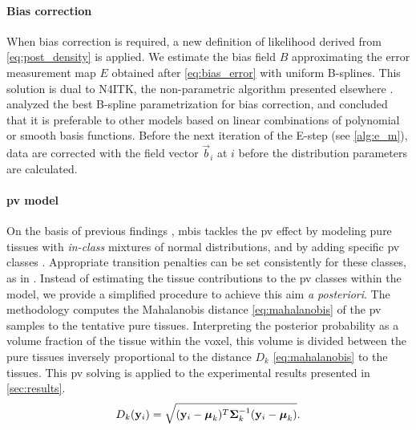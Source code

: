 \paragraph{Bias correction}\label{par:bias_correction} %
When bias correction is required, a new definition of likelihood
  derived from \eqref{eq:post_density} is applied.
We estimate the bias field $B$ approximating the error measurement map
  $E$ obtained after \eqref{eq:bias_error} with uniform B-splines.
This solution is dual to N4ITK, the non-parametric algorithm presented
  elsewhere \cite{tustison_n4itk:_2010}.
\citeauthor{tustison_n4itk:_2010} analyzed the best B-spline parametrization
  for bias correction, and concluded that it is preferable to other models
  based on linear combinations of polynomial or smooth basis functions.
Before the next iteration of the E-step (see \autoref{alg:e_m}), data are
  corrected with the field vector $\vec{b}_{i}$ at $i$ before the distribution 
  parameters are calculated.

\paragraph{\Acrlong*{pv} model}\label{par:model} %
On the basis of previous findings \citep{cuadra_comparison_2005}, \gls*{mbis}
  tackles the \gls*{pv} effect by modeling pure tissues with \emph{in-class}
  mixtures of normal distributions, and by adding specific \gls*{pv} classes
  \citep{noe_partial_2001}.
Appropriate transition penalties can be set consistently for these classes, as
  in \citep{cuadra_comparison_2005}.
Instead of estimating the tissue contributions to the \gls*{pv} classes
  within the model, we provide a simplified procedure to achieve this aim
  \emph{a posteriori}.
The methodology computes the Mahalanobis distance \eqref{eq:mahalanobis}
  of the \gls*{pv} samples to the tentative pure tissues.
Interpreting the posterior probability as a volume fraction of the tissue
  within the voxel, this volume is divided between the pure tissues inversely
  proportional to the distance $D_k$ \eqref{eq:mahalanobis} to the tissues.
This \gls*{pv} solving is applied to the experimental results presented
  in \autoref{sec:results}.
\begin{equation}
\label{eq:mahalanobis}
D_k(\mathbf{y}_i) = \sqrt{(\mathbf{y}_{i}-\boldsymbol{\mu}_{k})^{T}\boldsymbol{\Sigma}_{k}^{-1}(\mathbf{y}_{i}-\boldsymbol{\mu}_{k})}.
\end{equation}

